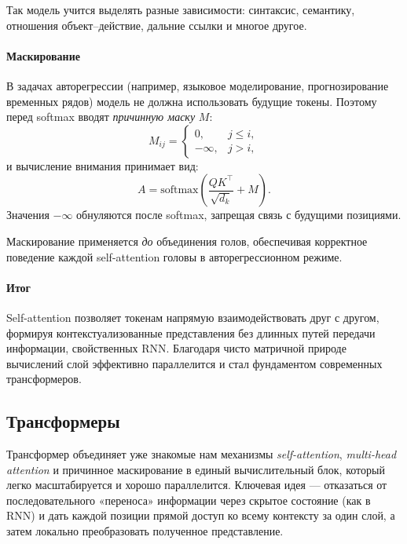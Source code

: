 \documentclass[12pt,a4paper]{article}
\begin{document}
Так модель учится выделять разные зависимости: синтаксис, семантику,
отношения объект–действие, дальние ссылки и многое другое.

\paragraph{Маскирование}
В задачах авторегрессии (например, языковое моделирование, прогнозирование временных рядов) модель не должна использовать будущие токены.
Поэтому перед softmax вводят \textit{причинную маску} $M$:
\[
M_{ij} =
\begin{cases}
0, & j \le i, \\
-\infty, & j > i,
\end{cases}
\]
и вычисление внимания принимает вид:
\[
A =
\mathrm{softmax}
\left(
\frac{QK^\top}{\sqrt{d_k}} + M
\right).
\]
Значения $-\infty$ обнуляются после softmax, запрещая связь с будущими позициями.

Маскирование применяется \emph{до} объединения голов, обеспечивая корректное поведение каждой self-attention головы в авторегрессионном режиме.

\paragraph{Итог}
Self-attention позволяет токенам напрямую взаимодействовать друг с другом, формируя контекстуализованные представления без длинных путей передачи информации, свойственных RNN.
Благодаря чисто матричной природе вычислений слой эффективно параллелится и стал фундаментом современных трансформеров.



\subsection{Трансформеры}

Трансформер объединяет уже знакомые нам механизмы \textit{self-attention}, \textit{multi-head attention} и причинное маскирование в единый вычислительный блок, который легко масштабируется и хорошо параллелится. Ключевая идея — отказаться от последовательного «переноса» информации через скрытое состояние (как в RNN) и дать каждой позиции прямой доступ ко всему контексту за один слой, а затем локально преобразовать полученное представление.
\end{document}
